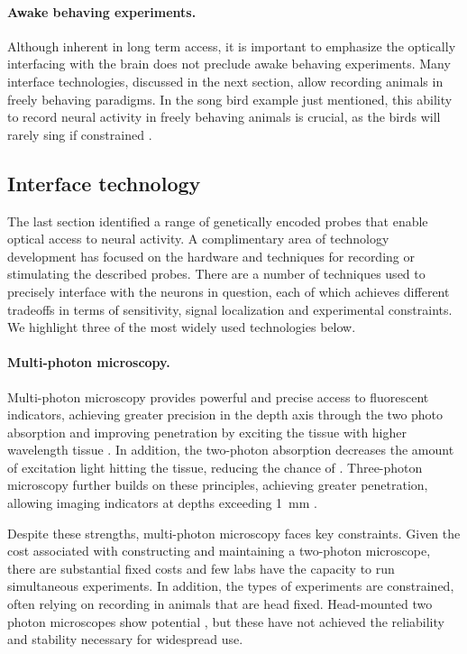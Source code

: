 \paragraph{Awake behaving experiments.} Although inherent in 
long term access, it is important to emphasize the optically 
interfacing with the brain does not preclude awake behaving 
experiments. Many interface technologies, discussed in the 
next section, allow recording animals in freely behaving 
paradigms. In the song bird example just mentioned, this 
ability to record neural activity in freely behaving animals 
is crucial, as the birds will rarely sing if constrained 
\cite{LibertiIII:2017df}.

\subsection{Interface technology}

The last section identified 
a range of genetically encoded probes that enable optical 
access to neural activity. A complimentary area of 
technology development has focused on the hardware and 
techniques for recording or stimulating the described 
probes. There are a number of techniques used to precisely 
interface with the neurons in question, each of which 
achieves different tradeoffs in terms of sensitivity, 
signal localization and experimental constraints. We 
highlight three of the most widely used technologies 
below.

\paragraph{Multi-photon microscopy.} Multi-photon microscopy
provides powerful and precise access to fluorescent indicators,
achieving greater precision in the depth axis through the 
two photo absorption and improving penetration by exciting the 
tissue with higher wavelength tissue \cite{Xu:1996ul}. In addition,
the two-photon absorption decreases the amount of excitation light 
hitting the tissue, reducing the chance of \cite{Denk:1990ws}.
Three-photon microscopy further builds on these principles, 
achieving greater penetration, allowing imaging indicators 
at depths exceeding 1~mm \cite{Horton:2013gxa,Wang:2017jp}.

Despite these strengths, multi-photon microscopy faces key 
constraints. Given the cost associated with constructing and 
maintaining a two-photon microscope, there are substantial fixed 
costs and few labs have the capacity to run simultaneous 
experiments. In addition, the types of experiments are constrained,
often relying on recording in animals that are head fixed. 
Head-mounted two photon microscopes show 
potential \cite{Helmchen:2001tw,Flusberg:2005tq}, but these 
have not achieved the reliability and stability necessary for 
widespread use.

